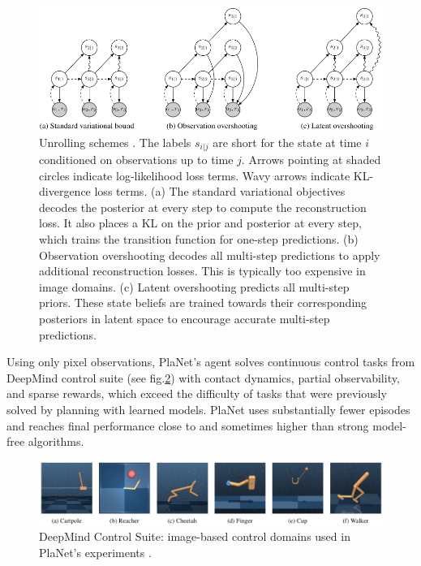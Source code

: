 \begin{figure}[H]
\includegraphics[width=1.0\textwidth,keepaspectratio]{figures/PlaNet/overshooting.png}
\caption[PlaNet latent dynamics model unrolling schemes]{Unrolling schemes \protect\cite{Algo.PlaNet}. The labels $s_{i|j}$ are short for the state at time $i$ conditioned on observations up to time $j$. Arrows pointing at shaded circles indicate log-likelihood loss terms. Wavy arrows indicate KL-divergence loss terms. (a) The standard variational objectives decodes the posterior at every step to compute the reconstruction loss. It also places a KL on the prior and posterior at every step, which trains the transition function for one-step predictions. (b) Observation overshooting decodes all multi-step predictions to apply additional reconstruction losses. This is typically too expensive in image domains. (c) Latent overshooting predicts all multi-step priors. These state beliefs are trained towards their corresponding posteriors in latent space to encourage accurate multi-step predictions.}
\label{Fig.PlaNetModelUnrolling}
\end{figure}

Using only pixel observations, PlaNet's agent solves continuous control tasks from DeepMind control suite (see fig.\ref{Fig.DeepMindControlSuite}) with contact dynamics, partial observability, and sparse rewards, which exceed the difficulty of tasks that were previously solved by planning with learned models. PlaNet uses substantially fewer episodes and reaches final performance close to and sometimes higher than strong model-free algorithms.

\begin{figure}[H]
\includegraphics[width=1.0\textwidth,keepaspectratio]{figures/PlaNet/benchmarks.png}
\caption[DeepMind Control Suite]{DeepMind Control Suite: image-based control domains used in PlaNet's experiments \protect\cite{Algo.PlaNet}.}
\label{Fig.DeepMindControlSuite}
\end{figure}

